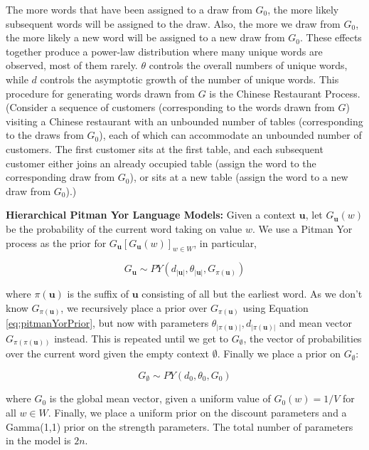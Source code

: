 The more words that have been assigned to a draw from $G_{0}$, the more likely subsequent words will be assigned to the draw. Also, the more we draw from $G_{0}$, the more likely a new word will be assigned to a new draw from $G_{0}$. These effects together produce a power-law distribution where many unique words are observed, most of them rarely. $\theta$ controls the overall numbers of unique words, while $d$ controls the asymptotic growth of the number of unique words. This procedure for generating words drawn from $G$ is the Chinese Restaurant Process. (Consider a sequence of customers (corresponding to the words drawn from $G$) visiting a Chinese restaurant with an unbounded number of tables (corresponding to the draws from $G_{0}$), each of which can accommodate an unbounded number of customers. The first customer sits at the first table, and each subsequent customer either joins an already occupied table (assign the word to the corresponding draw from $G_{0}$), or sits at a new table (assign the word to a new draw from $G_{0}$).)

\textbf{Hierarchical Pitman Yor Language Models:} Given a context $\boldsymbol{u}$, let $G_{\boldsymbol{u}}(w)$ be the probability of the current word taking on value $w$. We use a Pitman Yor process as the prior for $G_{\boldsymbol{u}}[G_{\boldsymbol{u}}(w)]_{w \in W}$, in particular,

\begin{equation}
G_{\boldsymbol{u}}\sim PY(d_{|\boldsymbol{u}|}, \theta_{|\boldsymbol{u}|}, G_{\pi(\boldsymbol{u})})
\label{eq:pitmanYorPrior}
\end{equation}

\noindent where $\pi(\boldsymbol{u})$ is the suffix of $\boldsymbol{u}$ consisting of all but the earliest word. As we don't know $G_{\pi(\boldsymbol{u})}$, we recursively place a prior over $G_{\pi(\boldsymbol{u})}$ using Equation \ref{eq:pitmanYorPrior}, but now with parameters $\theta_{|\pi(\boldsymbol{u})|}, d_{|\pi(\boldsymbol{u})|}$ and mean vector $G_{\pi(\pi(\boldsymbol{u}))}$ instead. This is repeated until we get to $G_{\emptyset}$, the vector of probabilities over the current word given the empty context $\emptyset$. Finally we place a prior on $G_{\emptyset}$:

\begin{equation}
G_{\emptyset} \sim PY(d_{0}, \theta_{0}, G_{0})
\label{eq:emptyContextPrior}
\end{equation}

\noindent where $G_{0}$ is the global mean vector, given a uniform value of $G_{0}(w)=1/V$ for all $w \in W$. Finally, we place a uniform prior on the discount parameters and a Gamma(1,1) prior on the strength parameters. The total number of parameters in the model is $2n$.

